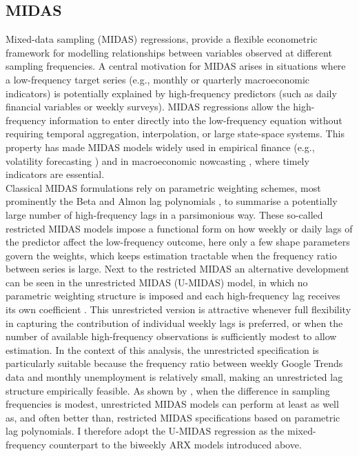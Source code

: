 \documentclass[12pt,a4paper]{article}
\begin{document}
\subsection{MIDAS}
Mixed-data sampling (MIDAS) regressions, provide a flexible econometric framework for modelling relationships between variables observed at different sampling frequencies. A central motivation for MIDAS arises in situations where a low-frequency target series (e.g., monthly or quarterly macroeconomic indicators) is potentially explained by high-frequency predictors (such as daily financial variables or weekly surveys). MIDAS regressions allow the high-frequency information to enter directly into the low-frequency equation without requiring temporal aggregation, interpolation, or large state-space systems. This property has made MIDAS models widely used in empirical finance (e.g., volatility forecasting \citet{ghysels}) and in macroeconomic nowcasting \citep{clements2008macroeconomic}, where timely indicators are essential.\\
Classical MIDAS formulations rely on parametric weighting schemes, most prominently the Beta and Almon lag polynomials \citep{ghysels, ghysel2}, to summarise a potentially large number of high-frequency lags in a parsimonious way. These so-called restricted MIDAS models impose a functional form on how weekly or daily lags of the predictor affect the low-frequency outcome, here only a few shape parameters govern the weights, which keeps estimation tractable when the frequency ratio between series is large.
Next to the restricted MIDAS an alternative  development can be seen in the unrestricted MIDAS (U-MIDAS) model, in which no parametric weighting structure is imposed and each high-frequency lag receives its own coefficient \citep{foroni2015unrestricted}. This unrestricted version is 
attractive whenever full flexibility in capturing the contribution of individual weekly lags is preferred, or when the number of available high-frequency observations is sufficiently modest to allow estimation.
In the context of this analysis, the unrestricted specification is particularly suitable because the frequency ratio between weekly Google Trends data and monthly unemployment is relatively small, making an unrestricted lag structure empirically feasible. As shown by \citet{foroni2015unrestricted}, when the difference in sampling frequencies is modest, unrestricted MIDAS models can perform at least as well as, and often better than, restricted MIDAS specifications based on parametric lag polynomials. I therefore adopt the U-MIDAS regression as the mixed-frequency counterpart to the biweekly ARX models introduced above.\\
\end{document}
